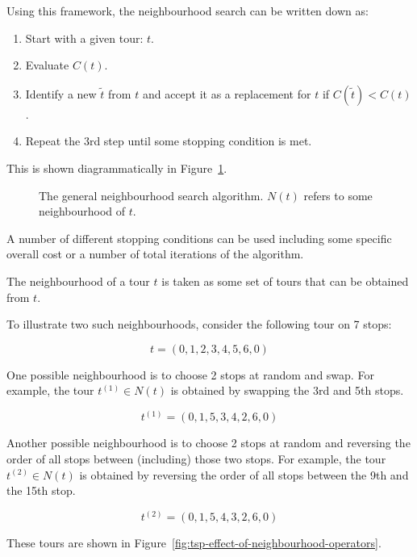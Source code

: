Using this framework, the neighbourhood search can be written down as:

\begin{enumerate}
    \item Start with a given tour: \(t\).
    \item Evaluate \(C(t)\).
    \item Identify a new \(\tilde t\) from \(t\) and accept it as a replacement
        for \(t\) if \(C(\tilde t)<
        C(t)\).
    \item Repeat the 3rd step until some stopping condition is met.
\end{enumerate}

This is shown diagrammatically in Figure~\ref{fig:tsp}.

\begin{figure}[!hbtp]
    \begin{center}
        
    \end{center}
    \caption{The general neighbourhood search algorithm. \(N(t)\) refers to some
    neighbourhood of \(t\).}
    \label{fig:tsp}
\end{figure}

A number of different stopping conditions can be used including some specific
overall cost or a number of total iterations of the algorithm.

The neighbourhood of a tour \(t\) is taken as some set of tours that can be
obtained from \(t\).

To illustrate two such neighbourhoods, consider the following tour on 7 stops:

\[
    t = (0, 1, 2, 3, 4, 5, 6, 0)
\]

One possible neighbourhood is to choose 2 stops at random and swap. For
example, the tour \(t^{(1)}\in N(t)\) is obtained by swapping the 3rd and 5th
stops.

\[
    t^{(1)} = (0, 1, 5, 3, 4, 2, 6, 0)
\]

Another possible neighbourhood is to choose 2 stops at random and reversing the
order
of all stops between (including) those two stops. For example, the tour
\(t^{(2)} \in N(t)\) is obtained by reversing the order of all stops between
the 9th and the 15th stop.

\[
    t^{(2)} = (0, 1, 5, 4, 3, 2, 6, 0)
\]

These tours are shown in Figure~\ref{fig:tsp-effect-of-neighbourhood-operators}.

